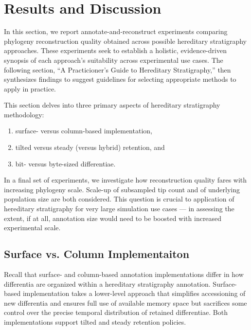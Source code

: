 \section{Results and Discussion} \label{sec:results}

In this section, we report annotate-and-reconstruct experiments comparing phylogeny reconstruction quality obtained across possible hereditary stratigraphy approaches.
These experiments seek to establish a holistic, evidence-driven synopsis of each approach's suitability across experimental use cases.
The following section, ``A Practicioner's Guide to Hereditary Stratigraphy,'' then synthesizes findings to suggest guidelines for selecting appropriate methods to apply in practice.

This section delves into three primary aspects of hereditary stratigraphy methodology:
\begin{enumerate}
\item surface- versus column-based implementation,
\item tilted versus steady (versus hybrid) retention, and
\item bit- versus byte-sized differentiae.
\end{enumerate}

In a final set of experiments, we investigate how reconstruction quality fares with increasing phylogeny scale.
Scale-up of subsampled tip count and of underlying population size are both considered.
This question is crucial to application of hereditary stratigraphy for very large simulation use cases --- in assessing the extent, if at all, annotation size would need to be boosted with increased experimental scale.

\subsection{Surface vs. Column Implementaiton} \label{sec:surface-vs-column}



Recall that surface- and column-based annotation implementations differ in how differentia are organized within a hereditary stratigraphy annotation.
Surface-based implementation takes a lower-level approach that simplifies accessioning of new differentia and ensures full use of available memory space but sacrifices some control over the precise temporal distribution of retained differentiae.
Both implementations support tilted and steady retention policies.

